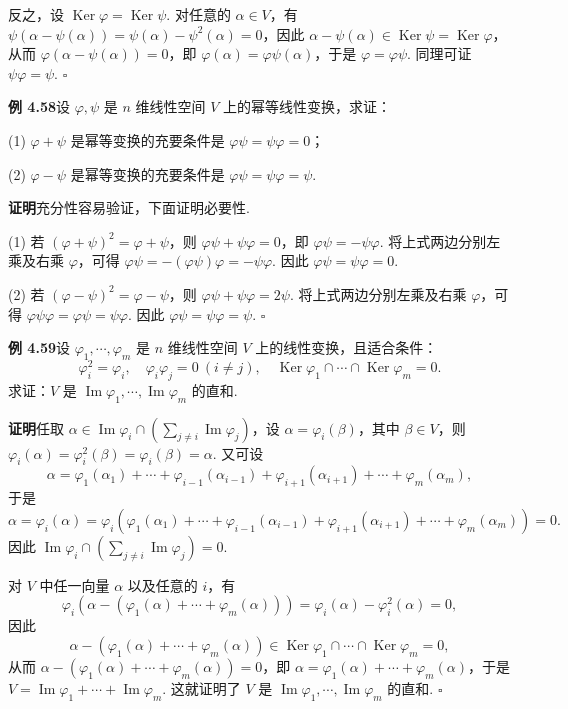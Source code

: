 \documentclass[UTF8, 12pt, fontset=fandol, oneside]{ctexart}
\begin{document}
反之，设 $\operatorname{Ker}\varphi=\operatorname{Ker}\psi$. 对任意的 $\alpha\in V$，有 $\psi(\alpha-\psi(\alpha))=\psi(\alpha)-\psi^2(\alpha)=0$，因此 $\alpha-\psi(\alpha)\in\operatorname{Ker}\psi=\operatorname{Ker}\varphi$，从而 $\varphi(\alpha-\psi(\alpha))=0$，即 $\varphi(\alpha)=\varphi\psi(\alpha)$，于是 $\varphi=\varphi\psi$. 同理可证 $\psi\varphi=\psi$. $\square$

\noindent\textbf{例 4.58}\quad 设 $\varphi,\psi$ 是 $n$ 维线性空间 $V$ 上的幂等线性变换，求证：

(1) $\varphi+\psi$ 是幂等变换的充要条件是 $\varphi\psi=\psi\varphi=0$；

(2) $\varphi-\psi$ 是幂等变换的充要条件是 $\varphi\psi=\psi\varphi=\psi$.

\noindent\textbf{证明}\quad 充分性容易验证，下面证明必要性.

(1) 若 $(\varphi+\psi)^2=\varphi+\psi$，则 $\varphi\psi+\psi\varphi=0$，即 $\varphi\psi=-\psi\varphi$. 将上式两边分别左乘及右乘 $\varphi$，可得 $\varphi\psi=-(\varphi\psi)\varphi=-\psi\varphi$. 因此 $\varphi\psi=\psi\varphi=0$.

(2) 若 $(\varphi-\psi)^2=\varphi-\psi$，则 $\varphi\psi+\psi\varphi=2\psi$. 将上式两边分别左乘及右乘 $\varphi$，可得 $\varphi\psi\varphi=\varphi\psi=\psi\varphi$. 因此 $\varphi\psi=\psi\varphi=\psi$. $\square$

\noindent\textbf{例 4.59}\quad 设 $\varphi_1,\cdots,\varphi_m$ 是 $n$ 维线性空间 $V$ 上的线性变换，且适合条件：
\[
\varphi_i^2=\varphi_i,\quad \varphi_i\varphi_j=0\ (i\ne j),\quad
\operatorname{Ker}\varphi_1\cap\cdots\cap\operatorname{Ker}\varphi_m=0.
\]
求证：$V$ 是 $\operatorname{Im}\varphi_1,\cdots,\operatorname{Im}\varphi_m$ 的直和.

\noindent\textbf{证明}\quad 任取 $\alpha\in\operatorname{Im}\varphi_i\cap\left(\sum_{j\ne i}\operatorname{Im}\varphi_j\right)$，设 $\alpha=\varphi_i(\beta)$，其中 $\beta\in V$，则 $\varphi_i(\alpha)=\varphi_i^2(\beta)=\varphi_i(\beta)=\alpha$. 又可设
\[
\alpha=\varphi_1(\alpha_1)+\cdots+\varphi_{i-1}(\alpha_{i-1})+\varphi_{i+1}(\alpha_{i+1})+\cdots+\varphi_m(\alpha_m),
\]
于是
\[
\alpha=\varphi_i(\alpha)=\varphi_i(\varphi_1(\alpha_1)+\cdots+\varphi_{i-1}(\alpha_{i-1})+\varphi_{i+1}(\alpha_{i+1})+\cdots+\varphi_m(\alpha_m))=0.
\]
因此 $\operatorname{Im}\varphi_i\cap\left(\sum_{j\ne i}\operatorname{Im}\varphi_j\right)=0$.

对 $V$ 中任一向量 $\alpha$ 以及任意的 $i$，有
\[
\varphi_i(\alpha-(\varphi_1(\alpha)+\cdots+\varphi_m(\alpha)))=\varphi_i(\alpha)-\varphi_i^2(\alpha)=0,
\]
因此
\[
\alpha-(\varphi_1(\alpha)+\cdots+\varphi_m(\alpha))\in\operatorname{Ker}\varphi_1\cap\cdots\cap\operatorname{Ker}\varphi_m=0,
\]
从而 $\alpha-(\varphi_1(\alpha)+\cdots+\varphi_m(\alpha))=0$，即 $\alpha=\varphi_1(\alpha)+\cdots+\varphi_m(\alpha)$，于是 $V=\operatorname{Im}\varphi_1+\cdots+\operatorname{Im}\varphi_m$. 这就证明了 $V$ 是 $\operatorname{Im}\varphi_1,\cdots,\operatorname{Im}\varphi_m$ 的直和. $\square$
\end{document}
